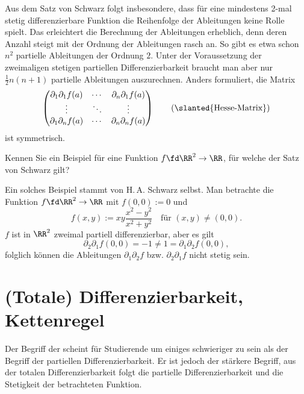 \begin{antwort}
  Aus dem Satz von Schwarz folgt insbesondere, dass für eine 
  mindestens 2-mal stetig differenzierbare Funktion die Reihenfolge der 
  Ableitungen keine Rolle spielt. Das erleichtert die Berechnung der Ableitungen 
  erheblich, denn deren Anzahl steigt mit der Ordnung der Ableitungen rasch an. 
  So gibt es etwa schon $n^2$ partielle Ableitungen der Ordnung $2$. 
  Unter der Voraussetzung der zweimaligen stetigen  partiellen 
  Differenzierbarkeit braucht man aber nur $\frac{1}{2}n (n+1)$ 
  partielle Ableitungen auszurechnen. Anders formuliert, die 
  Matrix
  \[
  \begin{pmatrix} 
    \partial_1 \partial_1 f(a) & \cdots & \partial_n \partial_1 f(a)  \\
    \vdots    & \ddots & \vdots \\
    \partial_1 \partial_n f(a) & \cdots & \partial_n \partial_n f(a)
  \end{pmatrix} \qquad\text{(\slanted{Hesse-Matrix})}
  \]
  ist symmetrisch. \AntEnd
\end{antwort}



\begin{frage}
  Kennen Sie ein Beispiel für eine Funktion $f \fd \RR^2\to\RR$, 
  für welche der Satz von Schwarz  gilt?
\end{frage}

\begin{antwort}
  Ein solches Beispiel stammt von H.\,A. Schwarz selbst. Man betrachte die 
  Funktion $f \fd \RR^2 \to \RR$ mit $f(0,0):=0$ und 
  \[
  f(x,y) :=  xy\frac{x^2-y^2}{x^2+y^2} \quad \text{für $(x,y) \not= (0,0)$}.
  \]
  $f$ ist in $\RR^2$ zweimal partiell differenzierbar, aber es gilt
  \[
  \partial_2 \partial_1 f(0,0) =-1 \not=1 = \partial_1 \partial_2 f(0,0), 
  \]
  folglich können die Ableitungen $\partial_1 \partial_2 f$ bzw. 
  $\partial_2 \partial_1 f$ nicht stetig sein. 
  \AntEnd 
\end{antwort}


\section{(Totale) Differenzierbarkeit, Kettenregel}\label{total}

Der Begriff der  
scheint für Studierende um einiges schwieriger zu sein als der Begriff 
der partiellen Differenzierbarkeit. Er ist jedoch der stärkere Begriff, 
aus der totalen Differenzierbarkeit folgt die partielle Differenzierbarkeit 
und die Stetigkeit der betrachteten Funktion.

